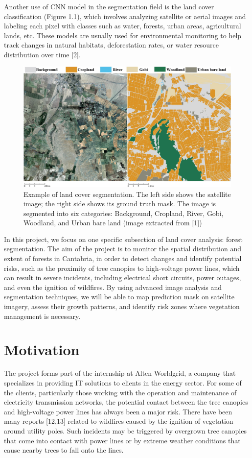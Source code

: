 Another use of CNN model in the segmentation field is the land cover classification (Figure 1.1), which involves analyzing satellite or aerial images and labeling each pixel with classes such as water, forests, urban areas, agricultural lands, etc. These models are usually used for environmental monitoring to help track changes in natural habitats, deforestation rates, or water resource distribution over time [2].\\
\begin{figure}[h]
 \centering
 \includegraphics[scale=1.05]{IMAGENES/IMG1-Introduction.jpg}
 \captionsetup{font=large}
 \caption {Example of land cover segmentation. The left side shows the satellite image; the right side shows its ground truth mask. The image is segmented into six categories: Background, Cropland, River, Gobi, Woodland, and Urban bare land (image extracted from [1])}
\end{figure}


In this project, we focus on one specific subsection of land cover analysis: forest segmentation. The aim of the project is to monitor the spatial distribution and extent of forests in Cantabria, in order to detect changes and identify potential risks, such as the proximity of tree canopies to high-voltage power lines, which can result in severe incidents, including electrical short circuits, power outages, and even the ignition of wildfires. By using advanced image analysis and segmentation techniques, we will be able to map prediction mask on satellite imagery, assess their growth patterns, and identify risk zones where vegetation management is necessary. 

\newpage
\section{Motivation}
The project forms part of the internship at Alten-Worldgrid, a company that specializes in providing IT solutions to clients in the energy sector. For some of the clients, particularly those working with the operation and maintenance of electricity transmission networks, the potential contact between the tree canopies and high-voltage power lines has always been a major risk. There have been many reports [12,13] related to wildfires caused by the ignition of vegetation around utility poles. Such incidents may be triggered by overgrown tree canopies that come into contact with power lines or by extreme weather conditions that cause nearby trees to fall onto the lines.
\\


